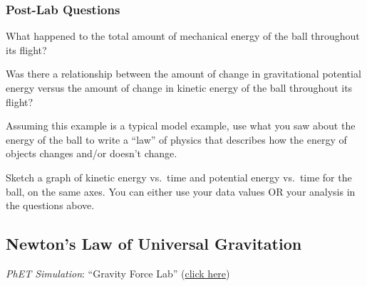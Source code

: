 \documentclass[main-physics.tex]{subfiles}
\begin{document}
\subsubsection*{Post-Lab Questions}

\begin{exercise}
    What happened to the total amount of mechanical energy of the ball throughout its flight?
\end{exercise}

\begin{exercise}
    Was there a relationship between the amount of change in gravitational potential energy versus the amount of change in kinetic energy of the ball throughout its flight?
\end{exercise}

\begin{exercise}
    Assuming this example is a typical model example, use what you saw about the energy of the ball to write a ``law'' of physics that describes how the energy of objects changes and/or doesn't change. 
\end{exercise}

\begin{exercise}
    Sketch a graph of kinetic energy vs.~time and potential energy vs.~time for the ball, on the same axes. You can either use your data values OR your analysis in the questions above.
\end{exercise}



\subsection{Newton's Law of Universal Gravitation}

 \textit{PhET Simulation}: ``Gravity Force Lab'' (\href{https://phet.colorado.edu/sims/html/gravity-force-lab/latest/gravity-force-lab_en.html}{click here})
\end{document}
